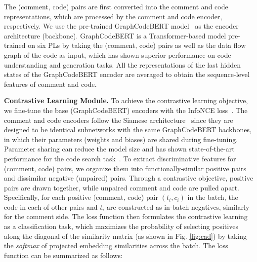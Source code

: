 The (comment, code) pairs are first converted into the comment and code representations, which are processed by the comment and code encoder, respectively. We use the pre-trained GraphCodeBERT model~\cite{guo2020graphcodebert} as the encoder architecture (\ie backbone). GraphCodeBERT is a Transformer-based model pre-trained on six PLs by taking the (comment, code) pairs as well as the data flow graph of the code as input, which has shown superior performance on code understanding and generation tasks. All the representations of the last hidden states of the GraphCodeBERT encoder are averaged to obtain the sequence-level features of comment and code.


\textbf{Contrastive Learning Module.} To achieve the contrastive learning objective, we fine-tune the base (GraphCodeBERT) encoders with the InfoNCE loss~\cite{oord2018representation}. The comment and code encoders follow the Siamese architecture~\cite{guo2022unixcoder} since they are designed to be identical subnetworks with the same GraphCodeBERT backbones, in which their parameters (\ie weights and biases) are shared during fine-tuning. Parameter sharing can reduce the model size and has shown state-of-the-art performance for the code search task~\cite{shi2023cocosoda}. To extract discriminative features for (comment, code) pairs, we organize them into functionally-similar positive pairs and dissimilar negative (unpaired) pairs. Through a contrastive objective, positive pairs are drawn together, while unpaired comment and code are pulled apart. Specifically, for each positive (comment, code) pair $(t_i, c_i)$ in the batch, the code in each of other pairs and $t_i$ are constructed as in-batch negatives, similarly for the comment side. The loss function then formulates the contrastive learning as a classification task, which maximizes the probability of selecting positives along the diagonal of the similarity matrix (as shown in Fig. \ref{fig:cad}) by taking the \textit{softmax} of projected embedding similarities across the batch.  The loss function can be summarized as follows: 

